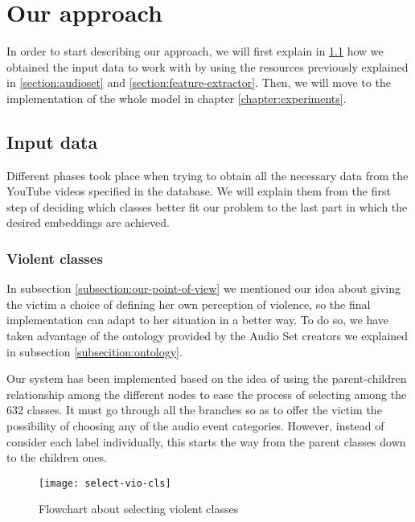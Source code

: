 \section{Our approach}
\label{section:our-approach}

	In order to start describing our approach, we will first explain in \ref{subsection:input-data} how we obtained the input data to work with by using the resources previously explained in \ref{section:audioset} and \ref{section:feature-extractor}. Then, we will move to the implementation of the whole model in chapter \ref{chapter:experiments}.

\subsection{Input data}
\label{subsection:input-data}

	Different phases took place when trying to obtain all the necessary data from the YouTube videos specified in the database. We will explain them from the first step of deciding which classes better fit our problem to the last part in which the desired embeddings are achieved.

\subsubsection{Violent classes}
\label{subsection:violent-classes}

	In subsection \ref{subsection:our-point-of-view} we mentioned our idea about giving the victim a choice of defining her own perception of violence, so the final implementation can adapt to her situation in a better way. To do so, we have taken advantage of the ontology provided by the Audio Set creators we explained in subsection \ref{subsecition:ontology}. 

	Our system has been implemented based on the idea of using the parent-children relationship among the different nodes to ease the process of selecting among the 632 classes. It must go through all the branches so as to offer the victim the possibility of choosing any of the audio event categories. However, instead of consider each label individually, this starts the way from the parent classes down to the children ones.
	
	\begin{wrapfigure}[18]{R}[-18mm]{0.4\textwidth}
		\centering
		\captionsetup{justification=centering}
		\texttt{[image: select-vio-cls]}
		\caption{Flowchart about selecting violent classes}
		\label{fig:mesh3}
	\end{wrapfigure}
	
